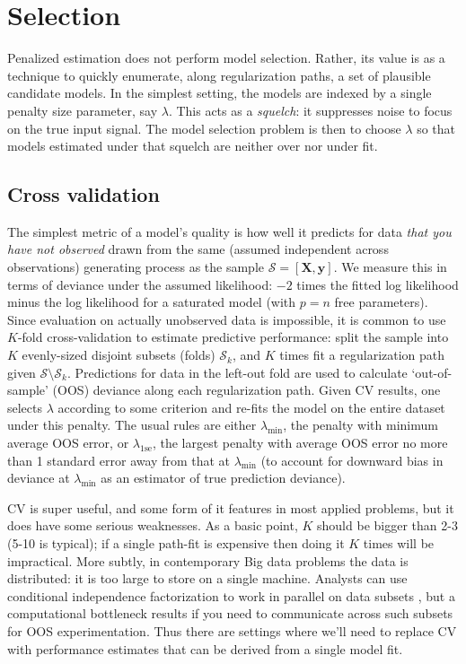 \documentclass[12pt]{article}
\newcommand{\mc}[1]{\mathcal{#1}}
\newcommand{\mr}[1]{\mathrm{#1}}
\newcommand{\bm}[1]{\mathbf{#1}}
\begin{document}
\section{Selection}
\label{selection}

Penalized estimation does not perform model selection. Rather, its value is as
a technique to quickly enumerate,  along regularization paths, a set of
plausible candidate models.   In the simplest setting, the models are  indexed
by a single penalty size parameter, say $\lambda$. This acts as a {\it
squelch}: it suppresses noise to focus on the true input signal.  The model
selection problem is then to choose $\lambda$ so that models estimated under
that  squelch are neither over nor under fit.

\subsection{Cross validation}

The simplest metric of a model's quality is how well it predicts for data {\it
that you have not observed} drawn from the same (assumed independent across
observations) generating process as the sample $\mc{S} = [\bm{X},\bm{y}]$.  We
measure this in terms of deviance under the assumed likelihood: $-2$ times the
fitted log likelihood minus the log likelihood for a saturated model (with
$p=n$ free parameters).  Since evaluation on actually unobserved data is
impossible, it is common to use $K$-fold cross-validation \cite[CV; see][for
an overview]{efron_estimation_2004} to estimate  predictive performance: split
the sample into $K$  evenly-sized disjoint subsets (folds) $\mc{S}_k$,  and
$K$ times fit a regularization path given $\mc{S} \setminus \mc{S}_k$.
Predictions for data in the left-out fold are  used to calculate `out-of-
sample' (OOS) deviance   along each regularization path. Given CV results, one
selects $\lambda$ according to some criterion and re-fits the model on the
entire dataset under this penalty.  The usual rules are either
$\lambda_{\mr{min}}$, the penalty with minimum average OOS error, or
$\lambda_{1\mr{se}}$, the largest penalty with average OOS error no more than
1 standard error away from that at $\lambda_{\mr{min}}$ (to account for
downward bias in deviance at $\lambda_{\mr{min}}$ as an estimator of true
prediction deviance).

CV is super useful, and some form of it features in most applied problems, but
it does have some serious weaknesses. As a basic point, $K$ should be bigger
than 2-3 (5-10 is typical); if a single path-fit is expensive then doing it
$K$ times will be impractical.  More subtly, in contemporary Big data problems
the data is distributed: it is too large to store on a single machine.
Analysts can use conditional independence factorization to work in parallel on
data subsets \citep[e.g.,][]{taddy_distributed_2013}, but a computational
bottleneck results if you need to communicate across such subsets for OOS
experimentation.  Thus there are settings where we'll need to replace CV with
performance estimates that can be derived from  a single model fit.
\end{document}

